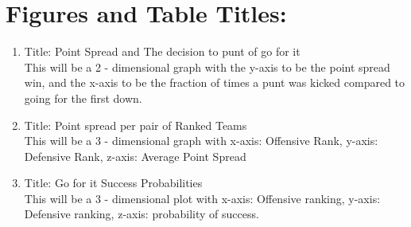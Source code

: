 \documentclass{article}
\begin{document}
\section*{Figures and Table Titles: }
\begin{enumerate}
\item
Title: Point Spread and The decision to punt of go for it\\
This will be a 2 - dimensional graph with the y-axis to be the point spread win, and the x-axis to be the fraction of times a punt was kicked compared to going for the first down. 
\item
Title: Point spread per pair of Ranked Teams\\
This will be a 3 - dimensional graph with x-axis: Offensive Rank, y-axis: Defensive Rank, z-axis: Average Point Spread
\item
Title: Go for it Success Probabilities\\
This will be a 3 - dimensional plot with x-axis: Offensive ranking, y-axis: Defensive ranking, z-axis: probability of success.
\end{enumerate}
\end{document}
